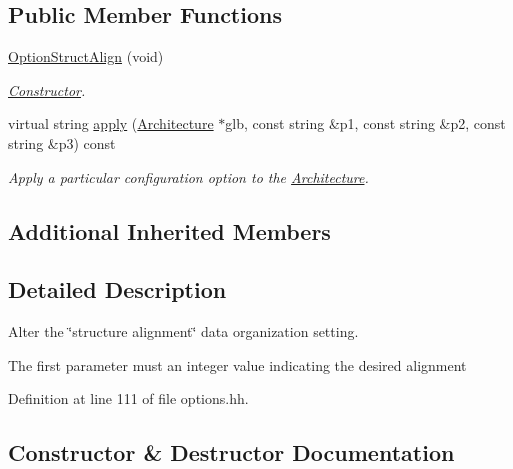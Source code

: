 \subsection*{Public Member Functions}
\begin{DoxyCompactItemize}
\item 
\mbox{\hyperlink{class_option_struct_align_af5581832392e30cbd801219069498084}{Option\+Struct\+Align}} (void)
\begin{DoxyCompactList}\small\item\em \mbox{\hyperlink{class_constructor}{Constructor}}. \end{DoxyCompactList}\item 
virtual string \mbox{\hyperlink{class_option_struct_align_abe8f802c3e37987b0b5094b4699c20df}{apply}} (\mbox{\hyperlink{class_architecture}{Architecture}} $\ast$glb, const string \&p1, const string \&p2, const string \&p3) const
\begin{DoxyCompactList}\small\item\em Apply a particular configuration option to the \mbox{\hyperlink{class_architecture}{Architecture}}. \end{DoxyCompactList}\end{DoxyCompactItemize}
\subsection*{Additional Inherited Members}


\subsection{Detailed Description}
Alter the \char`\"{}structure alignment\char`\"{} data organization setting. 

The first parameter must an integer value indicating the desired alignment 

Definition at line 111 of file options.\+hh.



\subsection{Constructor \& Destructor Documentation}
\mbox{\label{class_option_struct_align_af5581832392e30cbd801219069498084}} 
